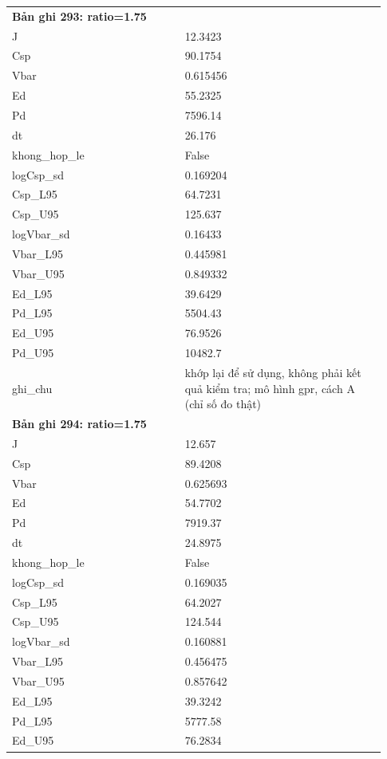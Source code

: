 \begin{longtable}{p{0.43\linewidth}p{0.50\linewidth}}
\midrule
\multicolumn{2}{p{0.95\linewidth}}{\textbf{Bản ghi 293: ratio=1.75}} \\
J & 12.3423 \\
Csp & 90.1754 \\
Vbar & 0.615456 \\
Ed & 55.2325 \\
Pd & 7596.14 \\
dt & 26.176 \\
khong\_\allowbreak hop\_\allowbreak le & False \\
logCsp\_\allowbreak sd & 0.169204 \\
Csp\_\allowbreak L95 & 64.7231 \\
Csp\_\allowbreak U95 & 125.637 \\
logVbar\_\allowbreak sd & 0.16433 \\
Vbar\_\allowbreak L95 & 0.445981 \\
Vbar\_\allowbreak U95 & 0.849332 \\
Ed\_\allowbreak L95 & 39.6429 \\
Pd\_\allowbreak L95 & 5504.43 \\
Ed\_\allowbreak U95 & 76.9526 \\
Pd\_\allowbreak U95 & 10482.7 \\
ghi\_\allowbreak chu & khớp lại để sử dụng, không phải kết quả kiểm tra; mô hình gpr, cách A (chỉ số đo thật) \\
\midrule
\multicolumn{2}{p{0.95\linewidth}}{\textbf{Bản ghi 294: ratio=1.75}} \\
J & 12.657 \\
Csp & 89.4208 \\
Vbar & 0.625693 \\
Ed & 54.7702 \\
Pd & 7919.37 \\
dt & 24.8975 \\
khong\_\allowbreak hop\_\allowbreak le & False \\
logCsp\_\allowbreak sd & 0.169035 \\
Csp\_\allowbreak L95 & 64.2027 \\
Csp\_\allowbreak U95 & 124.544 \\
logVbar\_\allowbreak sd & 0.160881 \\
Vbar\_\allowbreak L95 & 0.456475 \\
Vbar\_\allowbreak U95 & 0.857642 \\
Ed\_\allowbreak L95 & 39.3242 \\
Pd\_\allowbreak L95 & 5777.58 \\
Ed\_\allowbreak U95 & 76.2834 \\

\end{longtable}
